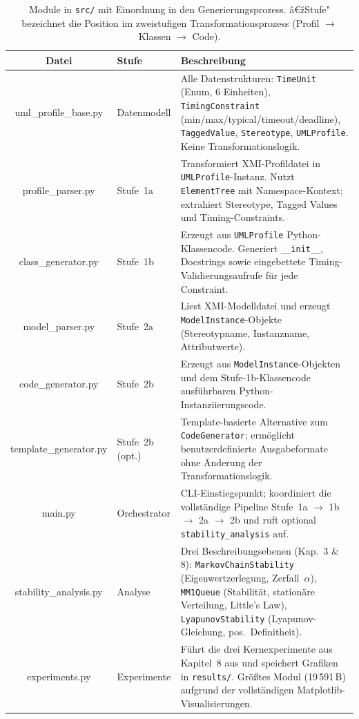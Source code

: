 ﻿\documentclass[a4paper,12pt]{scrreprt}
\theoremstyle{definition}
\begin{document}
\begin{table}[H]
	\small
	\centering
	\renewcommand{\arraystretch}{1.35}
	\begin{tabular}{@{} C l p{6.1cm} @{}}
		\toprule
		\normalfont\textbf{Datei} &
		\textbf{Stufe} &
		\textbf{Beschreibung} \\
		\midrule
		uml\_profile\_base.py  & Datenmodell &
		Alle Datenstrukturen: \texttt{TimeUnit} (Enum, 6 Einheiten),
		\texttt{TimingConstraint} (min/max/typical/timeout/deadline),
		\texttt{TaggedValue}, \texttt{Stereotype}, \texttt{UMLProfile}.
		Keine Transformationslogik. \\
		
		profile\_parser.py     & Stufe~1a &
		Transformiert XMI-Profildatei in \texttt{UMLProfile}-Instanz.
		Nutzt \texttt{ElementTree} mit Namespace-Kontext; extrahiert
		Stereotype, Tagged Values und Timing-Constraints. \\
		
		class\_generator.py    & Stufe~1b &
		Erzeugt aus \texttt{UMLProfile} Python-Klassencode.
		Generiert \texttt{\_\_init\_\_}, Docstrings sowie eingebettete
		Timing-Validierungsaufrufe für jede Constraint. \\
		
		model\_parser.py       & Stufe~2a &
		Liest XMI-Modelldatei und erzeugt \texttt{ModelInstance}-Objekte
		(Stereotypname, Instanzname, Attributwerte). \\
		
		code\_generator.py     & Stufe~2b &
		Erzeugt aus \texttt{ModelInstance}-Objekten und dem
		Stufe-1b-Klassencode ausführbaren Python-Instanziierungscode. \\
		
		template\_generator.py & Stufe~2b (opt.) &
		Template-basierte Alternative zum \texttt{CodeGenerator};
		ermöglicht benutzerdefinierte Ausgabeformate ohne Änderung
		der Transformationslogik. \\
		
		main.py                & Orchestrator &
		CLI-Einstiegspunkt; koordiniert die vollständige Pipeline
		Stufe~1a $\to$ 1b $\to$ 2a $\to$ 2b und ruft optional
		\texttt{stability\_analysis} auf. \\
		
		stability\_analysis.py & Analyse &
		Drei Beschreibungsebenen (Kap.~3 \& 8):
		\texttt{MarkovChainStability} (Eigenwertzerlegung, Zerfall~$\alpha$),
		\texttt{MM1Queue} (Stabilität, stationäre Verteilung, Little's Law),
		\texttt{LyapunovStability} (Lyapunov-Gleichung, pos.\ Definitheit). \\
		
		experiments.py         & Experimente &
		Führt die drei Kernexperimente aus Kapitel~8 aus und speichert
		Grafiken in \texttt{results/}. Größtes Modul (19\,591\,B)
		aufgrund der vollständigen Matplotlib-Visualisierungen. \\
		\bottomrule
	\end{tabular}
	\caption{Module in \texttt{src/} mit Einordnung in den
		Generierungsprozess.  â€žStufe" bezeichnet die Position
		im zweistufigen Transformationsprozess
		(Profil $\to$ Klassen $\to$ Code).}
	\label{tab:module-src}
\end{table}
\end{document}
